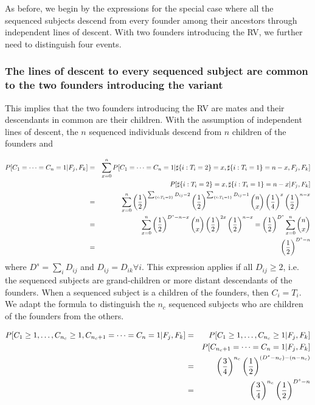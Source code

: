 \documentclass[12pt]{aastex}
\begin{document}
As before, we begin by the expressions for the special case where all the sequenced subjects descend from every founder among their ancestors through independent lines of descent. With two founders introducing the RV, we further need to distinguish four events.

\subsubsection{The lines of descent to every sequenced subject are common to the two founders introducing the variant}

This implies that the two founders introducing the RV are mates and their descendants in common are their children. With the assumption of independent lines of descent, the $n$ sequenced individuals descend from $n$ children of the founders and

\begin{eqnarray}
P[C_1 = \dots = C_n = 1 | F_j, F_k] &=& \sum_{x=0}^n  P[C_1 = \dots = C_n = 1 | \sharp \{ i : T_i = 2\} = x, \sharp \{ i : T_i = 1\} = n - x, F_j, F_k] \nonumber \\
& &  P[\sharp \{ i : T_i = 2\} = x, \sharp \{ i : T_i = 1\} = n - x| F_j, F_k]\\
 &=& \sum_{x=0}^n \left( {1 \over 2} \right)^{\sum_{\{ i : T_i = 2\}} D_{ij}-2} \left( {1 \over 2} \right)^{\sum_{\{ i : T_i = 1\}} D_{ij}-1} {n \choose x} \left( {1 \over 4} \right)^x \left( {1 \over 2} \right)^{n-x} \nonumber \\
 &=& \sum_{x=0}^n \left( {1 \over 2} \right)^{D^s - n - x}  {n \choose x} \left( {1 \over 2} \right)^{2x} \left( {1 \over 2} \right)^{n-x} = \left( {1 \over 2} \right)^{D^s} \sum_{x=0}^n  {n \choose x} \nonumber \\
&=& \left( {1 \over 2} \right)^{D^s - n}  \nonumber
\end{eqnarray}
where $D^s = \sum_i D_{ij}$ and $D_{ij} = D_{ik} \forall i$. This expression applies if all $D_{ij} \geq 2$, i.e. the sequenced subjects are grand-children or more distant descendants of the founders. When a sequenced subject is a children of the founders, then $C_i = T_i$. We adapt the formula to distinguish the $n_c$ sequenced subjects who are children of the founders from the others.

\begin{eqnarray}
P[C_1 \geq 1, \dots, C_{n_c} \geq 1, C_{n_c+1} = \dots = C_n = 1 | F_j, F_k] &=& P[C_1 \geq 1, \dots, C_{n_c} \geq 1| F_j, F_k] \\
& & P[ C_{n_c+1} = \dots = C_n = 1 | F_j, F_k] \nonumber \\
&=& \left( {3 \over 4} \right)^{n_c} \left( {1 \over 2} \right)^{(D^s - n_c) - (n - n_c)} \nonumber \\ 
&=& \left( {3 \over 4} \right)^{n_c} \left( {1 \over 2} \right)^{D^s - n} \nonumber 
\end{eqnarray}
\end{document}
